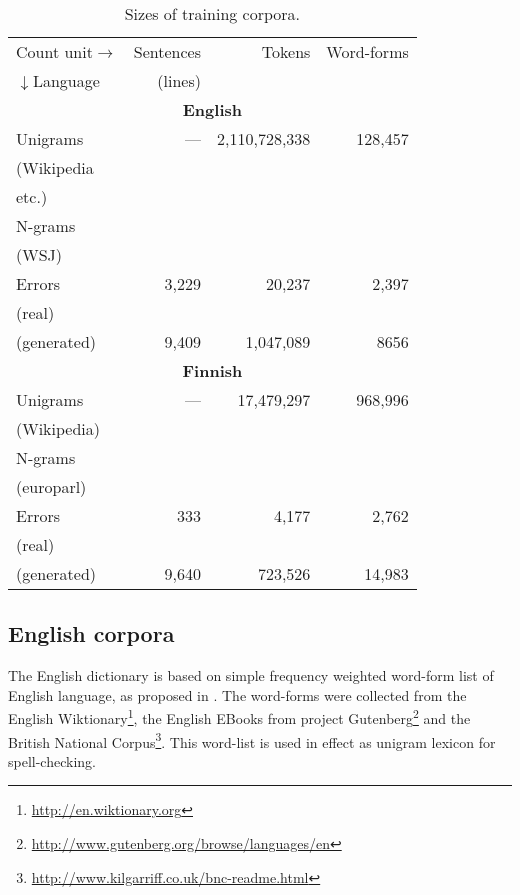\documentclass{llncs}
\begin{document}
\begin{table}
    \caption{Sizes of training corpora.
    \label{table:corpora}}
  \begin{center}
    \begin{scriptsize}
      \begin{tabular}{lrrr}
        \hline
        Count unit$\rightarrow$ & Sentences & Tokens & Word-forms \\
        $\downarrow$Language    & (lines)   &        &  \\
        \hline
        \multicolumn{4}{c}{\textbf{English}} \\
        \hline
        Unigrams & --- & 2,110,728,338 & 128,457  \\
        (Wikipedia & & & \\
        etc.) & & & \\
        N-grams & & & \\
        (WSJ) & & & \\
        Errors & 3,229 & 20,237 & 2,397 \\
        (real) & & & \\
        (generated) & 9,409 & 1,047,089 & 8656 \\
        \hline
        \multicolumn{4}{c}{\textbf{Finnish}} \\
        \hline
        Unigrams & --- & 17,479,297 & 968,996 \\
        (Wikipedia) & & & \\
        N-grams & & & \\
        (europarl) & & & \\
        Errors & 333 & 4,177 & 2,762 \\
        (real) & & & \\
        (generated) & 9,640 & 723,526 & 14,983 \\
        \hline
      \end{tabular}
    \end{scriptsize}
  \end{center}
\end{table}

\subsection{English corpora}

The English dictionary is based on simple frequency weighted word-form list of
English language, as proposed in \cite{norvig/2010}. The word-forms were
collected from the English Wiktionary\footnote{\url{http://en.wiktionary.org}},
the English EBooks from project
Gutenberg\footnote{\url{http://www.gutenberg.org/browse/languages/en}} and the
British National
Corpus\footnote{\url{http://www.kilgarriff.co.uk/bnc-readme.html}}. This
word-list is used in effect as unigram lexicon for spell-checking.
\end{document}
